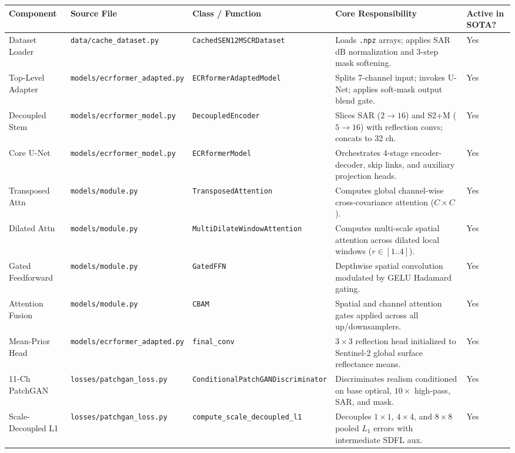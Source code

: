 \begin{table}[htbp]
\centering
\scriptsize
\begin{tabularx}{\textwidth}{llp{3.2cm}Xl}
\toprule
\textbf{Component} & \textbf{Source File} & \textbf{Class / Function} & \textbf{Core Responsibility} & \textbf{Active in SOTA?} \\
\midrule
Dataset Loader & \texttt{data/cache\_dataset.py} & \texttt{CachedSEN12MSCRDataset} & Loads \texttt{.npz} arrays; applies SAR dB normalization and 3-step mask softening. & Yes \\
Top-Level Adapter & \texttt{models/ecrformer\_adapted.py} & \texttt{ECRformerAdaptedModel} & Splits 7-channel input; invokes U-Net; applies soft-mask output blend gate. & Yes \\
Decoupled Stem & \texttt{models/ecrformer\_model.py} & \texttt{DecoupledEncoder} & Slices SAR ($2\to 16$) and S2+M ($5\to 16$) with reflection convs; concats to 32 ch. & Yes \\
Core U-Net & \texttt{models/ecrformer\_model.py} & \texttt{ECRformerModel} & Orchestrates 4-stage encoder-decoder, skip links, and auxiliary projection heads. & Yes \\
Transposed Attn & \texttt{models/module.py} & \texttt{TransposedAttention} & Computes global channel-wise cross-covariance attention ($C \times C$). & Yes \\
Dilated Attn & \texttt{models/module.py} & \texttt{MultiDilateWindowAttention} & Computes multi-scale spatial attention across dilated local windows ($r \in [1..4]$). & Yes \\
Gated Feedforward & \texttt{models/module.py} & \texttt{GatedFFN} & Depthwise spatial convolution modulated by GELU Hadamard gating. & Yes \\
Attention Fusion & \texttt{models/module.py} & \texttt{CBAM} & Spatial and channel attention gates applied across all up/downsamplers. & Yes \\
Mean-Prior Head & \texttt{models/ecrformer\_adapted.py} & \texttt{final\_conv} & $3\times 3$ reflection head initialized to Sentinel-2 global surface reflectance means. & Yes \\
11-Ch PatchGAN & \texttt{losses/patchgan\_loss.py} & \texttt{ConditionalPatchGANDiscriminator} & Discriminates realism conditioned on base optical, $10\times$ high-pass, SAR, and mask. & Yes \\
Scale-Decoupled L1 & \texttt{losses/patchgan\_loss.py} & \texttt{compute\_scale\_decoupled\_l1} & Decouples $1\times 1$, $4\times 4$, and $8\times 8$ pooled $L_1$ errors with intermediate SDFL aux. & Yes \\

\end{tabularx}
\end{table}
